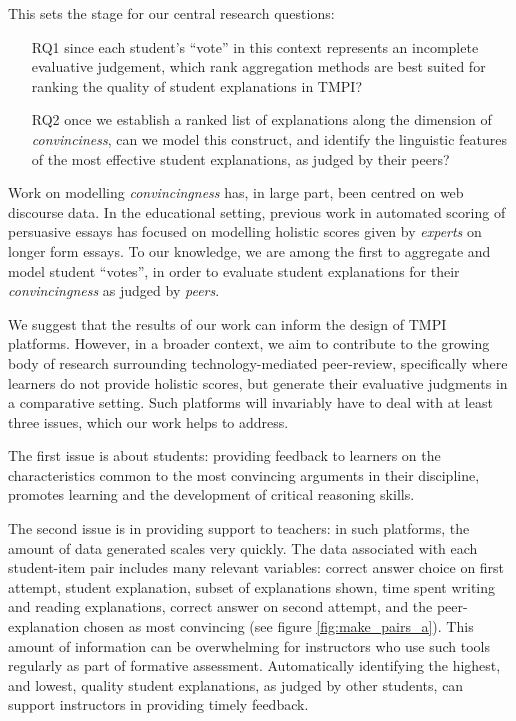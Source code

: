 \documentclass[notitlepage,12pt]{jedm}
\begin{document}
This sets the stage for our central research questions: 
\begin{itemize}
	\item[RQ1] since each student's ``vote'' in this context represents an 
	incomplete evaluative judgement, which rank aggregation 
	methods are best suited for ranking the quality of student 
	explanations in TMPI?
	\item[RQ2] once we establish a ranked list of explanations along the 
	dimension of \textit{convinciness}, can we model this construct, and 
	identify the linguistic features of the most effective student 
	explanations, as judged by their peers?
\end{itemize}

Work on modelling \textit{convincingness} has, in large part, been centred on 
web discourse data.
In the educational setting, previous work in automated scoring of persuasive 
essays has focused on modelling holistic scores given by \textit{experts} on 
longer form essays.
To our knowledge, we are among the first to aggregate and model student 
``votes'', in order to evaluate student explanations for their 
\textit{convincingness} as judged by \textit{peers}.

We suggest that the results of our work can inform the design of TMPI platforms.
However, in a broader context, we aim to contribute to the growing body of 
research surrounding technology-mediated peer-review, specifically where 
learners do not provide holistic scores, but generate their evaluative 
judgments in a comparative setting. 
Such platforms will invariably have to deal with at least three issues, which 
our work helps to address.

The first issue is about students: providing feedback to learners on the 
characteristics common to the most convincing arguments in their discipline, 
promotes learning and the development of critical reasoning skills.

The second issue is in providing support to teachers: in such platforms, the 
amount of data generated scales very quickly.
The data associated with each student-item pair includes many relevant 
variables: correct answer choice on first attempt, student explanation, subset 
of explanations shown, time spent writing and reading explanations, correct 
answer on second attempt, and the peer-explanation chosen as most convincing 
(see figure \ref{fig:make_pairs_a}).   
This amount of information can be overwhelming for instructors who use such 
tools regularly as part of formative assessment. 
Automatically identifying the highest, and lowest, quality student 
explanations, as judged by other students, can support instructors in providing 
timely feedback. 
\end{document}
